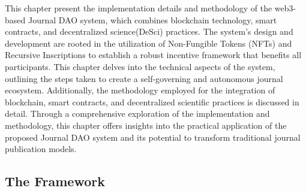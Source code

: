 \documentclass[lettersize,journal]{IEEEtran}
\begin{document}




% 



%  

This chapter present the implementation details and methodology of the web3-based Journal DAO system, which combines blockchain technology, smart contracts, and decentralized science(DeSci) practices. The system's design and development are rooted in the utilization of Non-Fungible Tokens (NFTs) and Recursive Inscriptions to establish a robust incentive framework that benefits all participants. This chapter delves into the technical aspects of the system, outlining the steps taken to create a self-governing and autonomous journal ecosystem. Additionally, the methodology employed for the integration of blockchain, smart contracts, and decentralized scientific practices is discussed in detail. Through a comprehensive exploration of the implementation and methodology, this chapter offers insights into the practical application of the proposed Journal DAO system and its potential to transform traditional journal publication models.



\subsection{The Framework}
\end{document}
